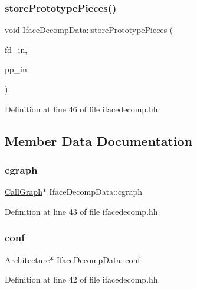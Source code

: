 \subsubsection{\texorpdfstring{storePrototypePieces()}{storePrototypePieces()}}
{\footnotesize\ttfamily void Iface\+Decomp\+Data\+::store\+Prototype\+Pieces (\begin{DoxyParamCaption}\item[{\mbox{\hyperlink{class_funcdata}{Funcdata}} $\ast$}]{fd\+\_\+in,  }\item[{\mbox{\hyperlink{struct_prototype_pieces}{Prototype\+Pieces}}}]{pp\+\_\+in }\end{DoxyParamCaption})\hspace{0.3cm}{\ttfamily [inline]}}



Definition at line 46 of file ifacedecomp.\+hh.



\subsection{Member Data Documentation}
\mbox{\label{class_iface_decomp_data_a89cdc94ddcd59bc2d70db51c0a4d5419}} 
\subsubsection{\texorpdfstring{cgraph}{cgraph}}
{\footnotesize\ttfamily \mbox{\hyperlink{class_call_graph}{Call\+Graph}}$\ast$ Iface\+Decomp\+Data\+::cgraph}



Definition at line 43 of file ifacedecomp.\+hh.

\mbox{\label{class_iface_decomp_data_ade09ccf947ddb5fda8f76dc9260337ec}} 
\subsubsection{\texorpdfstring{conf}{conf}}
{\footnotesize\ttfamily \mbox{\hyperlink{class_architecture}{Architecture}}$\ast$ Iface\+Decomp\+Data\+::conf}



Definition at line 42 of file ifacedecomp.\+hh.

